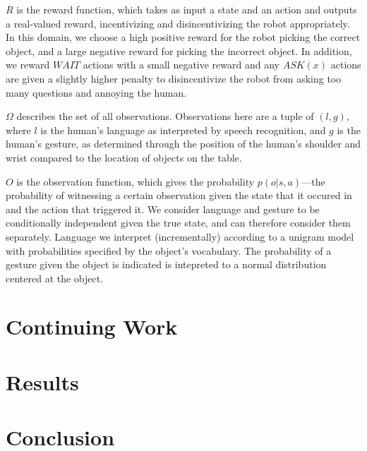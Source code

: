 \documentclass{article}
\begin{document}
$R$ is the reward function, which takes as input a state and an action and outputs a real-valued reward, incentivizing and disincentivizing the robot appropriately. In this domain, we choose a high positive reward for the robot picking the correct object, and a large negative reward for picking the incorrect object. In addition, we reward $WAIT$ actions with a small negative reward and any $ASK(x)$ actions are given a slightly higher penalty to disincentivize the robot from asking too many questions and annoying the human. 

$\Omega$ describes the set of all observations. Observations here are a tuple of $(l,g)$, where $l$ is the human's language as interpreted by speech recognition, and $g$ is the human's gesture, as determined through the position of the human's shoulder and wrist compared to the location of objects on the table. 

$O$ is the observation function, which gives the probability $p(o|s, a)$---the probability of witnessing a certain observation given the state that it occured in and the action that triggered it. We consider language and gesture to be conditionally independent given the true state, and can therefore consider them separately. Language we interpret (incrementally) according to a unigram model with probabilities specified by the object's vocabulary. The probability of a gesture given the object is indicated is intepreted to a normal distribution centered at the object. 


\section{Continuing Work}

\section{Results}

\section{Conclusion}
\end{document}

